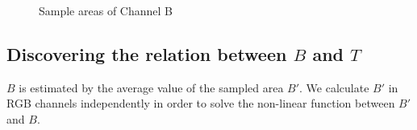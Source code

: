 \documentclass[10pt,twocolumn,letterpaper]{article}
\begin{document}
\begin{figure}[t]
{}

\caption{Sample areas of Channel B}
\label{fig:sampleb}
\end{figure}

\subsection{Discovering the relation between $B$ and $T$}

$B$ is estimated by the average value of the sampled area $B'$. We calculate $B'$ in RGB channels independently in order to solve the non-linear function between $B'$ and $B$. \\
\end{document}
